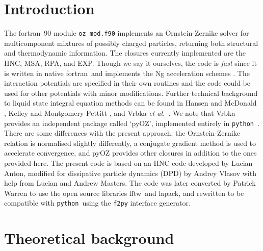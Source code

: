 \documentclass[12pt,a4paper]{article}
\newcommand{\latin}[1]{\emph{#1}}
\newcommand{\etal}{\latin{et al.}}
\newcommand{\FORTRAN}{{\sc fortran}}
\newcommand{\python}{{\tt python}}
\newcommand{\LAPACK}{{\sc lapack}}
\newcommand{\FFTW}{{\sc fftw}}
\begin{document}
\section{Introduction}
%
The \FORTRAN\ 90 module \verb+oz_mod.f90+ implements an
Ornstein-Zernike solver for multicomponent mixtures of possibly
charged particles, returning both structural and thermodynamic
information.  The closures currently implemented are the HNC, MSA,
RPA, and EXP.  Though we say it ourselves, the code is \emph{fast}
since it is written in native \FORTRAN\ and implements the Ng
acceleration schemes \cite{Ng74}.  The interaction potentials are
specified in their own routines and the code could be used for other
potentials with minor modifications.  Further technical background to
liquid state integral equation methods can be found in Hansen and
McDonald \cite{HM06}, Kelley and Montgomery Pettitt \cite{KMP04}, and
Vrbka \etal\ \cite{Vrbka09}.  We note that Vrbka provides an
independent package called `pyOZ', implemented entirely in
\python~\cite{Vrbka09}.  There are some differences with the present
approach: the Ornstein-Zernike relation is normalised slightly
differently, a conjugate gradient method is used to accelerate
convergence, and pyOZ provides other closures in addition to the ones
provided here.  The present code is based on an HNC code developed by
Lucian Anton, modified for dissipative particle dynamics (DPD) by
Andrey Vlasov with help from Lucian and Andrew Masters.  The code was
later converted by Patrick Warren to use the open source libraries
\FFTW\ and \LAPACK, and rewritten to be compatible with \python\ using
the \verb+f2py+ interface generator.

\section{Theoretical background}
%
\end{document}
